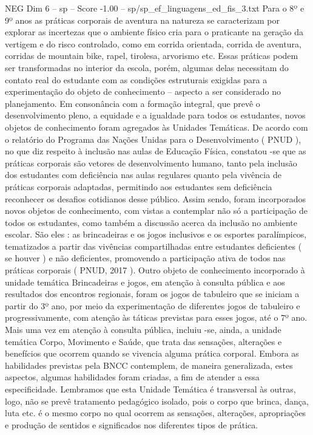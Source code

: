 \begin{textsample}{NEG Dim 6 – sp – Score -1.00 – sp/sp\_ef\_linguagens\_ed\_fis\_3.txt}
Para o 8º e 9º anos as práticas corporais de aventura na natureza se caracterizam por explorar as incertezas que o ambiente físico cria para o praticante na geração da vertigem e do risco controlado, como em corrida orientada, corrida de aventura, corridas de mountain bike, rapel, tirolesa, arvorismo etc.
Essas práticas podem ser transformadas no interior da escola, porém, algumas delas necessitam do contato real do estudante com as condições estruturais exigidas para a experimentação do objeto de conhecimento – aspecto a ser considerado no planejamento.
Em consonância com a formação integral, que prevê o desenvolvimento pleno, a equidade e a igualdade para todos os estudantes, novos objetos de conhecimento foram agregados às Unidades Temáticas.
De acordo com o relatório do Programa das Nações Unidas para o Desenvolvimento ( PNUD ), no que diz respeito à inclusão nas aulas de Educação Física, constatou -se que as práticas corporais são vetores de desenvolvimento humano, tanto pela inclusão dos estudantes com deficiência nas aulas regulares quanto pela vivência de práticas corporais adaptadas, permitindo aos estudantes sem deficiência reconhecer os desafios cotidianos desse público.
Assim sendo, foram incorporados novos objetos de conhecimento, com vistas a contemplar não só a participação de todos os estudantes, como também a discussão acerca da inclusão no ambiente escolar.
São eles : as brincadeiras e os jogos inclusivos e os esportes paralímpicos, tematizados a partir das vivências compartilhadas entre estudantes deficientes ( se houver ) e não deficientes, promovendo a participação ativa de todos nas práticas corporais ( PNUD, 2017 ).
Outro objeto de conhecimento incorporado à unidade temática Brincadeiras e jogos, em atenção à consulta pública e aos resultados dos encontros regionais, foram os jogos de tabuleiro que se iniciam a partir do 3º ano, por meio da experimentação de diferentes jogos de tabuleiro e progressivamente, com atenção às táticas previstas para esses jogos, até o 7º ano.
Mais uma vez em atenção à consulta pública, incluiu -se, ainda, a unidade temática Corpo, Movimento e Saúde, que trata das sensações, alterações e benefícios que ocorrem quando se vivencia alguma prática corporal.
Embora as habilidades previstas pela BNCC contemplem, de maneira generalizada, estes aspectos, algumas habilidades foram criadas, a fim de atender a essa especificidade.
Lembramos que esta Unidade Temática é transversal às outras, logo, não se prevê tratamento pedagógico isolado, pois o corpo que brinca, dança, luta etc. é o mesmo corpo no qual ocorrem as sensações, alterações, apropriações e produção de sentidos e significados nos diferentes tipos de prática.

\end{textsample}
